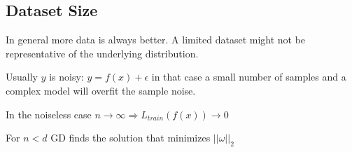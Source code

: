 \subsection{Dataset Size}

In general more data is always better. A limited dataset might not be representative of the underlying distribution. 

Usually $y$ is noisy: $y = f(x) + \epsilon$ in that case a small number of samples and a complex model will overfit the sample noise.

In the noiseless case $n \rightarrow \infty \Rightarrow L_{train}(f(x)) \rightarrow 0$

For $n < d $ GD finds the solution that minimizes $||\omega||_2$
